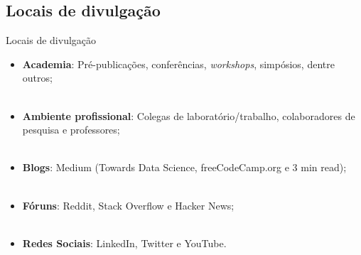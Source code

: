 \subsection{Locais de divulgação}
\label{ss.places_sharing}

\begin{frame}{Locais de divulgação}
	\justify
	\begin{itemize}
		\item \textbf{Academia}: Pré-publicações, conferências, \emph{workshops}, simpósios, dentre outros;
		\\~\\
		\item \textbf{Ambiente profissional}: Colegas de laboratório/trabalho, colaboradores de pesquisa e professores;
		\\~\\
		\item \textbf{Blogs}: Medium (Towards Data Science, freeCodeCamp.org e 3 min read);
		\\~\\
		\item \textbf{Fóruns}: Reddit, Stack Overflow e Hacker News;
		\\~\\
		\item \textbf{Redes Sociais}: LinkedIn, Twitter e YouTube.
	\end{itemize}
\end{frame}